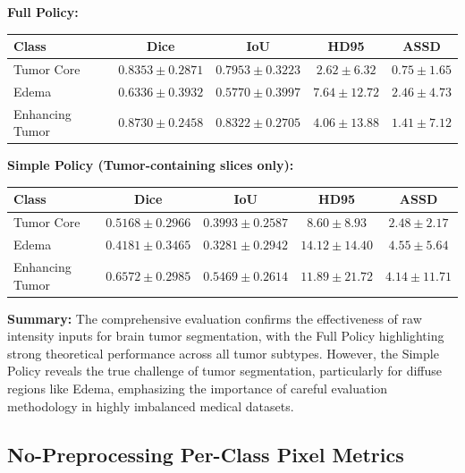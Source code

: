 \vspace{1em}
\noindent\textbf{Full Policy:}

\begin{center}
\begin{tabular}{lcccc}
\toprule
\textbf{Class} & \textbf{Dice} & \textbf{IoU} & \textbf{HD95} & \textbf{ASSD} \\
\midrule
Tumor Core       & $0.8353 \pm 0.2871$ & $0.7953 \pm 0.3223$ & $2.62 \pm 6.32$ & $0.75 \pm 1.65$ \\
Edema            & $0.6336 \pm 0.3932$ & $0.5770 \pm 0.3997$ & $7.64 \pm 12.72$ & $2.46 \pm 4.73$ \\
Enhancing Tumor  & $0.8730 \pm 0.2458$ & $0.8322 \pm 0.2705$ & $4.06 \pm 13.88$ & $1.41 \pm 7.12$ \\
\bottomrule
\end{tabular}
\end{center}

\clearpage

\noindent\textbf{Simple Policy (Tumor-containing slices only):}

\begin{center}
\begin{tabular}{lcccc}
\toprule
\textbf{Class} & \textbf{Dice} & \textbf{IoU} & \textbf{HD95} & \textbf{ASSD} \\
\midrule
Tumor Core       & $0.5168 \pm 0.2966$ & $0.3993 \pm 0.2587$ & $8.60 \pm 8.93$ & $2.48 \pm 2.17$ \\
Edema            & $0.4181 \pm 0.3465$ & $0.3281 \pm 0.2942$ & $14.12 \pm 14.40$ & $4.55 \pm 5.64$ \\
Enhancing Tumor  & $0.6572 \pm 0.2985$ & $0.5469 \pm 0.2614$ & $11.89 \pm 21.72$ & $4.14 \pm 11.71$ \\
\bottomrule
\end{tabular}
\end{center}

\vspace{1em}

\textbf{Summary:}  
The comprehensive evaluation confirms the effectiveness of raw intensity inputs for brain tumor segmentation, with the Full Policy highlighting strong theoretical performance across all tumor subtypes. However, the Simple Policy reveals the true challenge of tumor segmentation, particularly for diffuse regions like Edema, emphasizing the importance of careful evaluation methodology in highly imbalanced medical datasets.

\subsection{No-Preprocessing Per-Class Pixel Metrics}

